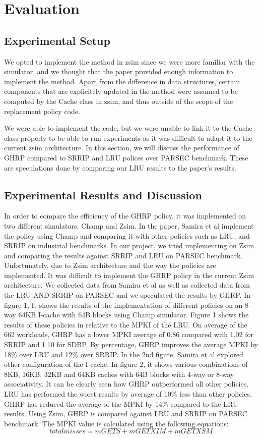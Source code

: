 \documentclass[11pt]{article}
\begin{document}
\section{Evaluation}
\label{sec:Evaluation}

\subsection{Experimental Setup}
We opted to implement the method in zsim since we were more familiar with the simulator, and we thought that the paper provided enough information to implement the method.
Apart from the difference in data structures, certain components that are explicitely updated in the method were assumed to be computed by the Cache class in zsim, and thus outside of the scope of the replacement policy code.\par
We were able to implement the code, but we were unable to link it to the Cache class properly to be able to run experiments as it was difficult to adapt it to the current zsim architecture. 
In this section, we will discuss the performance of GHRP compared to SRRIP and LRU polices over PARSEC benchmark. These are speculations done by comparing our LRU results to the paper's results.

\subsection{Experimental Results and Discussion}
In order to compare the efficiency of the GHRP policy, it was implemented on two different simulators; Champ and Zsim. In the paper, Samira et al implement the policy using
Champ and comparing it with other policies such as LRU, and SRRIP on industrial benchmarks. In our project, we tried implementing on Zsim and comparing the results against 
SRRIP and LRU on PARSEC benchmark. Unfortunately, due to Zsim architecture and the way the policies are implemented. It was difficult to implement the GHRP policy in the 
current Zsim architecture. We collected data from Samira et al as well as collected data from the  LRU AND SRRIP on PARSEC and we speculated the results by GHRP. In figure 1,
It shows the results of the implementation of different policies on an 8-way 64KB I-cache with 64B blocks using Champ simulator. Figure 1 shows the results of these policies in
relative to the MPKI of the LRU. On average of the 662 workloads, GHRP has a lower MPKI average of 0.86 compared with 1.02 for SRRIP and 1.10 for SDBP. By percentage, GHRP 
improves the average MPKI by 18\% over LRU and 12\% over SRRIP. In the 2nd figure, Samira et al explored other configuration of the I-cache. In figure 2,  it shows various 
combinations of 8KB,  16KB, 32KB and 64KB caches with 64B blocks with 4-way or 8-way associativity. It can be clearly seen how GHRP outperformed all other policies. LRU has
performed the worst results by average of 10\% less than other policies. GHRP has reduced the average of the MPKI by 14\% compared to the LRU results.
Using Zsim, GHRP is compared against LRU and SRRIP on PARSEC benchmark. The MPKI value is calculated using the following equations:  
\begin{equation}
total misses = mGETS + mGETXIM + mGETXSM
\end{equation}
\end{document}

